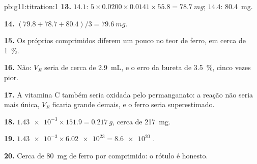 \begin{solution}{pb:g11:titration:1}
\textbf{13.} $14.1$: $5 \times 0.0200 \times 0.0141 \times 55.8 =
\qty{78.7}{mg}$; $14.4$: \qty{80.4}{mg}.

\textbf{14.} $(79.8 + 78.7 + 80.4)/3 = \qty{79.6}{mg}$.

\textbf{15.} Os próprios comprimidos diferem um pouco no teor de ferro,
em cerca de \qty{1}{\percent}.

\textbf{16.} Não: $V_E$ seria de cerca de \qty{2.9}{mL}, e o erro da
bureta de \qty{3.5}{\percent}, cinco vezes pior.

\textbf{17.} A vitamina C também seria oxidada pelo permanganato: a
reação não seria mais única, $V_E$ ficaria grande demais, e o ferro
seria superestimado.

\textbf{18.} $\num{1.43e-3} \times 151.9 = \qty{0.217}{g}$, cerca de
\qty{217}{mg}.

\textbf{19.} $\num{1.43e-3} \times \num{6.02e23} = \num{8.6e20}$ .

\textbf{20.} Cerca de \qty{80}{mg} de ferro por comprimido: o rótulo é
honesto.
\end{solution}
